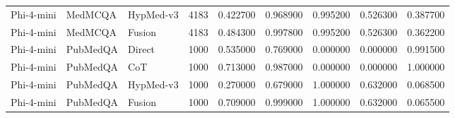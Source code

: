\begin{tabular}{lllrrrrrr}
Phi-4-mini & MedMCQA & HypMed-v3 & 4183 & 0.422700 & 0.968900 & 0.995200 & 0.526300 & 0.387700 \\
Phi-4-mini & MedMCQA & Fusion & 4183 & 0.484300 & 0.997800 & 0.995200 & 0.526300 & 0.362200 \\
Phi-4-mini & PubMedQA & Direct & 1000 & 0.535000 & 0.769000 & 0.000000 & 0.000000 & 0.991500 \\
Phi-4-mini & PubMedQA & CoT & 1000 & 0.713000 & 0.987000 & 0.000000 & 0.000000 & 1.000000 \\
Phi-4-mini & PubMedQA & HypMed-v3 & 1000 & 0.270000 & 0.679000 & 1.000000 & 0.632000 & 0.068500 \\
Phi-4-mini & PubMedQA & Fusion & 1000 & 0.709000 & 0.999000 & 1.000000 & 0.632000 & 0.065500 \\
\bottomrule
\end{tabular}
